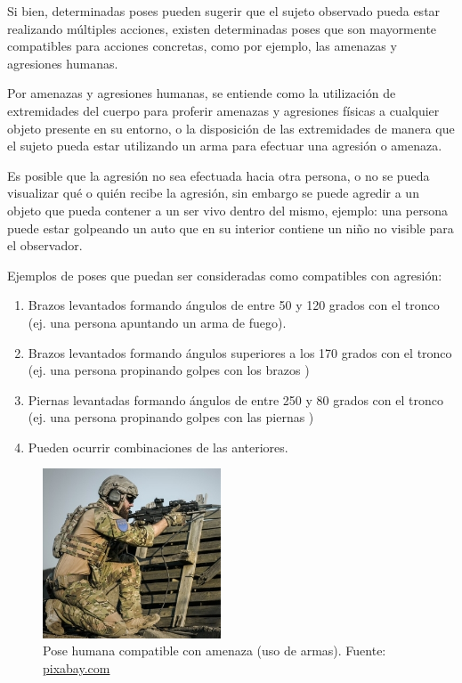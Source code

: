 \documentclass[a4paper,12pt,oneside,spanish]{book}
\begin{document}
Si bien, determinadas poses pueden sugerir que el sujeto observado pueda estar realizando múltiples acciones, existen determinadas poses que son mayormente compatibles para acciones concretas, como por ejemplo, las amenazas y agresiones humanas.\par

Por amenazas y agresiones humanas, se entiende como la utilización de extremidades del cuerpo para proferir amenazas y agresiones físicas a cualquier objeto presente en su entorno, o la disposición de las extremidades de manera que el sujeto pueda estar utilizando un arma para efectuar una agresión o amenaza. \par 

Es posible que la agresión no sea efectuada hacia otra persona, o no se pueda visualizar qué o quién recibe la agresión, sin embargo se puede agredir a un objeto que pueda contener a un ser vivo dentro del mismo, ejemplo: una persona puede estar golpeando un auto que en su interior contiene un niño no visible para el observador.\par

Ejemplos de poses que puedan ser consideradas como compatibles con agresión:

\begin{enumerate}
	\baselineskip 16pt
	\item Brazos levantados formando ángulos de entre 50 y 120 grados con el tronco (ej. una persona apuntando un arma de fuego). 
	\item Brazos levantados formando ángulos superiores a los 170 grados con el tronco (ej. una persona propinando golpes con los brazos ) 
	\item Piernas levantadas formando ángulos de entre 250 y 80 grados con el tronco  (ej. una persona propinando golpes con las piernas ) 
	\item Pueden ocurrir combinaciones de las anteriores.
\end{enumerate}

\begin{figure}[h!]
	\includegraphics[width=150pt]{Imagenes/pose2.jpg}
	\centering
	\caption{Pose humana compatible con amenaza (uso de armas). Fuente: \url{pixabay.com}}
	\label{fig:pose3}
\end{figure}
\end{document}
